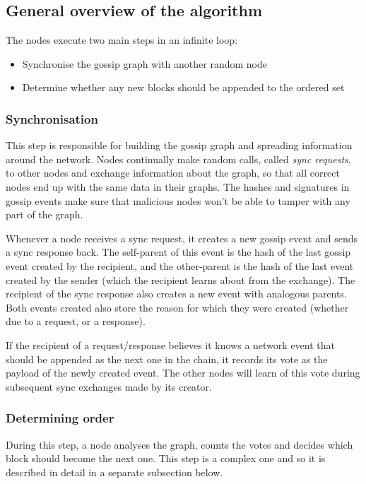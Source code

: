 \documentclass[a4paper,fleqn]{article}
\begin{document}
\subsection{General overview of the algorithm}

The nodes execute two main steps in an infinite loop:

\begin{itemize}
		\item Synchronise the gossip graph with another random node
		\item Determine whether any new blocks should be appended to the ordered set
\end{itemize}

\subsubsection{Synchronisation}

This step is responsible for building the gossip graph and spreading information around the
network. Nodes continually make random calls, called \emph{sync requests}, to other nodes and
exchange information about the graph, so that all correct nodes end up with the same data in their
graphs. The hashes and signatures in gossip events make sure that malicious nodes won't be able to
tamper with any part of the graph.

Whenever a node receives a sync request, it creates a new gossip event and sends a sync response
back. The self-parent of this event is the hash of the last gossip event created by the recipient,
and the other-parent is the hash of the last event created by the sender (which the recipient
learns about from the exchange). The recipient of the sync response also creates a new event with
analogous parents. Both events created also store the reason for which they were created (whether
due to a request, or a response).

If the recipient of a request/response believes it knows a network event that should be appended as
the next one in the chain, it records its vote as the payload of the newly created event. The other
nodes will learn of this vote during subsequent sync exchanges made by its creator.

\subsubsection{Determining order}

During this step, a node analyses the graph, counts the votes and decides which block should become
the next one. This step is a complex one and so it is described in detail in a separate subsection
below.
\end{document}
